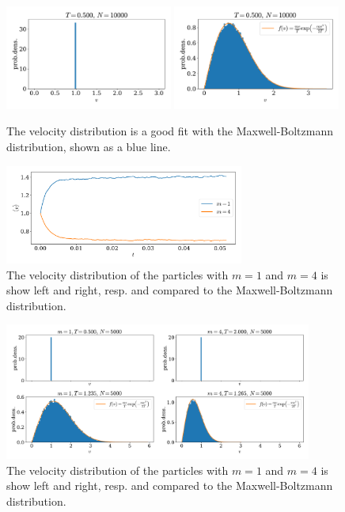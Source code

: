 \documentclass{article}
\begin{document}
    \begin{figure}[H]
        \centering
        \includegraphics[width=0.49\textwidth]{../plots/problem1/2/vel_dist.pdf}
        \includegraphics[width=0.49\textwidth]{../plots/problem1/vel_dist.pdf}
        \caption{The velocity distribution is a good fit with the Maxwell-Boltzmann distribution, shown as a blue line.}
        \label{problem1 dist}
    \end{figure}
    \begin{figure}[H]
        \centering
        \includegraphics[width=0.7\textwidth]{../plots/problem2/v_av.pdf}
        \caption{The velocity distribution of the particles with $m=1$ and $m=4$ is show left and right, resp. and compared to the Maxwell-Boltzmann distribution.}
        \label{problem2 av vel}
    \end{figure}
    \begin{figure}[H]
        \centering
        \includegraphics[width=0.9\textwidth]{../plots/problem2/vel_dist.pdf}
        \caption{The velocity distribution of the particles with $m=1$ and $m=4$ is show left and right, resp. and compared to the Maxwell-Boltzmann distribution.}
        \label{problem2 dist}
    \end{figure}
 
\end{document}
